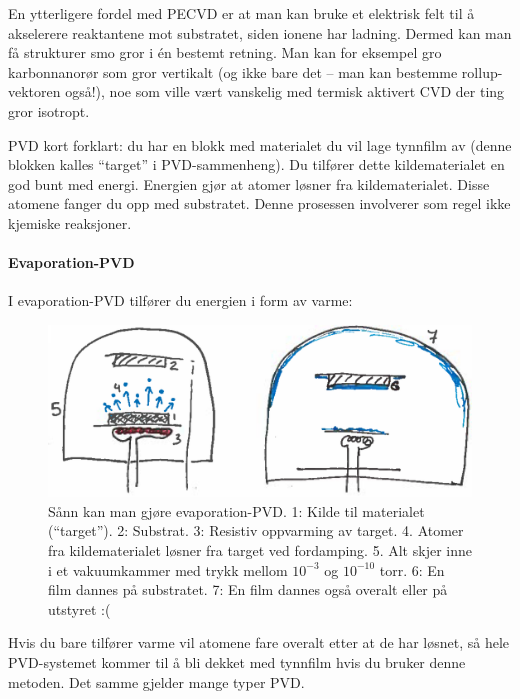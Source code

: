 En ytterligere fordel med PECVD er at man kan bruke et elektrisk felt til å akselerere reaktantene mot substratet, siden ionene har ladning. Dermed kan man få strukturer smo gror i én bestemt retning. Man kan for eksempel gro karbonnanorør som gror vertikalt (og ikke bare det -- man kan bestemme rollup-vektoren også!), noe som ville vært vanskelig med termisk aktivert CVD der ting gror isotropt.

PVD kort forklart: du har en blokk med materialet du vil lage tynnfilm av (denne blokken kalles ``target'' i PVD-sammenheng). Du tilfører dette kildematerialet en god bunt med energi. Energien gjør at atomer løsner fra kildematerialet. Disse atomene fanger du opp med substratet. Denne prosessen involverer som regel ikke kjemiske reaksjoner.

\paragraph{Evaporation-PVD} I evaporation-PVD tilfører du energien i form av varme:
\begin{figure}[H]
\bmd\centering
\includegraphics[width=\linewidth]{metodefigs/evappvd.png}
\caption{Sånn kan man gjøre evaporation-PVD. 1: Kilde til materialet (``target''). 2: Substrat. 3: Resistiv oppvarming av target. 4. Atomer fra kildematerialet løsner fra target ved fordamping. 5. Alt skjer inne i et vakuumkammer med trykk mellom $10^{-3}$ og $10^{-10}$ torr. 6: En film dannes på substratet. 7: En film dannes også overalt eller på utstyret :(}
\emd\end{figure}
Hvis du bare tilfører varme vil atomene fare overalt etter at de har løsnet, så hele PVD-systemet kommer til å bli dekket med tynnfilm hvis du bruker denne metoden. Det samme gjelder mange typer PVD.

